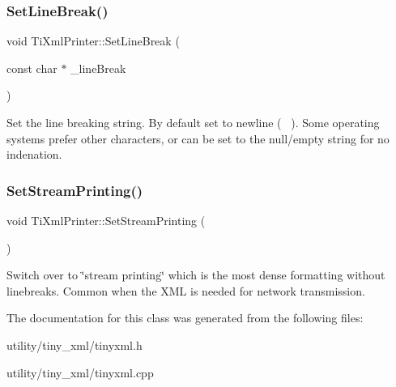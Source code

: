 \subsubsection{\texorpdfstring{Set\+Line\+Break()}{SetLineBreak()}}
{\footnotesize\ttfamily void Ti\+Xml\+Printer\+::\+Set\+Line\+Break (\begin{DoxyParamCaption}\item[{const char $\ast$}]{\+\_\+line\+Break }\end{DoxyParamCaption})\hspace{0.3cm}{\ttfamily [inline]}}

Set the line breaking string. By default set to newline (~\newline
). Some operating systems prefer other characters, or can be set to the null/empty string for no indenation. \mbox{\label{class_ti_xml_printer_ab23a90629e374cb1cadca090468bbd19}} 
\subsubsection{\texorpdfstring{Set\+Stream\+Printing()}{SetStreamPrinting()}}
{\footnotesize\ttfamily void Ti\+Xml\+Printer\+::\+Set\+Stream\+Printing (\begin{DoxyParamCaption}{ }\end{DoxyParamCaption})\hspace{0.3cm}{\ttfamily [inline]}}

Switch over to \char`\"{}stream printing\char`\"{} which is the most dense formatting without linebreaks. Common when the X\+ML is needed for network transmission. 

The documentation for this class was generated from the following files\+:\begin{DoxyCompactItemize}
\item 
utility/tiny\+\_\+xml/tinyxml.\+h\item 
utility/tiny\+\_\+xml/tinyxml.\+cpp\end{DoxyCompactItemize}
